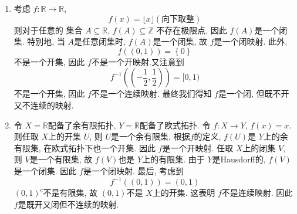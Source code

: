 \documentclass[../main.tex]{subfiles}
\begin{document}
\begin{solution}
\begin{enumerate}
     
      将 \(  S^{1}  \)视为复平面中的 \(  \left\{ z\in \mathbb{C} :\left| z \right|= 1  \right\}  \), 令 \[
      C\coloneqq \left\{ \left( e^{\frac{i }{n } },n \right)\in S^{1}\times \mathbb{R} :n\in \mathbb{Z} , n\ge 1  \right\}
      \]  说明 \(  C  \)是一个闭集, 只需要说明它不存在极限点. 事实上任取 \(  C  \)的序列 \(  \left( z_{n_{k}}, n_{k} \right)   \),\(  n_1\le n_2\le \cdots   \).  由于 \(  \lim_{k\to \infty}n_{k}= \infty  \),    \(  \left( z_{n_{k}},n_{k} \right)   \)不收敛于任何 \(  \left( c,q \right)\in S^{1}\times \mathbb{R}   \).  因此 \(  C  \)没有极限点, 从而是一个闭集.  但是 \[
       f\left( C \right)= \left\{ \frac{1 }{n } :n\in \mathbb{Z} , n\ge 1 \right\} 
      \] 其上的点构成一个序列 \(  \left( \frac{1 }{n } \right)   \), 收敛于 \(  \lim_{n\to \infty}\frac{1 }{n }   = 0\). 但 \(  0\not \in  f\left( C \right)   \), 这表明 \(   f\left( C \right)   \)不是一个闭集, 因此    \(  f  \)不是一个闭映射.  因此 \(  f  \)是一个开, 但既不连续也不闭的映射.  
      \item 考虑 \(  f:\mathbb{R} \to \mathbb{R}   \),  \[
      f\left( x \right) = \lfloor x \rfloor(\text{向下取整})
      \]则对于任意的 集合 \(  A\subseteq \mathbb{R}   \), \(  f\left( A \right)\subseteq \mathbb{Z}    \) 不存在极限点, 因此 \(  f\left( A \right)   \)是一个闭集.     特别地, 当 \(  A  \)是任意闭集时, \(  f\left( A \right)   \)是一个闭集, 故 \(  f  \)是一个闭映射.  此外,  \[
      f\left( \left( 0,1 \right)  \right)= \left\{ 0 \right\} 
      \]不是一个开集, 因此 \(  f  \)不是一个开映射.又注意到 \[
     f^{-1} \left( \left( -\frac{1 }{2 },\frac{1 }{2 }   \right)  \right)= [0,1) 
      \]不是一个开集, 因此 \(  f  \)不是一个连续映射. 最终我们得知 \(  f  \)是一个闭, 但既不开又不连续的映射.  
        \item 令 \(  X= \mathbb{R}   \)配备了余有限拓扑, \(  Y= \mathbb{R}   \)配备了欧式拓扑. 令 \(  f:X\to Y  \), \(  f\left( x \right)= x   \). 则任取 \(  X  \)上的开集 \(  U  \),   则 \(  U  \)是一个余有限集, 根据\(  f  \)的定义,   \(  f\left( U \right)   \)是 \(  Y  \)上的余有限集, 在欧式拓扑下也一个开集. 因此 \(  f  \)是一个开映射.    任取 \(  X  \)上的闭集 \(  V  \), 则 \(  V  \)是一个有限集,  故 \(  f\left( V \right)   \)也是 \(  Y  \)上的有限集. 由于 \(  Y  \)是Hausdorff的, \(  f\left( V \right)   \)是一个闭集. 因此 \(  f  \)是一个闭映射.  最后, 考虑到 \[
        f^{-1} \left( \left( 0,1 \right)  \right)= \left( 0,1 \right)  
        \]     \(  \left( 0,1 \right)^{c}   \)不是有限集, 故 \(  \left( 0,1 \right)   \)不是 \(  X  \)上的开集. 这表明 \(  f  \)不是连续映射.  因此 \(  f  \)是既开又闭但不连续的映射.     
    \end{enumerate}
    
\end{solution}
\end{document}
